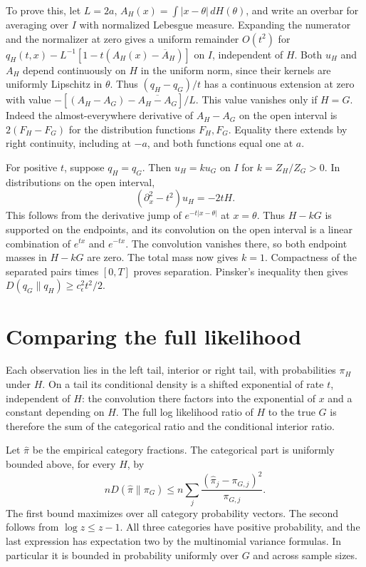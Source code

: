 \documentclass[11pt]{amsart}
\begin{document}
To prove this, let \(L=2a\), \(A_H(x)=\int|x-\theta|\,dH(\theta)\), and write an overbar for averaging over \(I\) with normalized Lebesgue measure. Expanding the numerator and the normalizer at zero gives a uniform remainder \(O(t^2)\) for \(q_H(t,x)-L^{-1}[1-t(A_H(x)-\overline A_H)]\) on \(I\), independent of \(H\). Both \(u_H\) and \(A_H\) depend continuously on \(H\) in the uniform norm, since their kernels are uniformly Lipschitz in \(\theta\). Thus \((q_H-q_G)/t\) has a continuous extension at zero with value \(-[(A_H-A_G)-\overline{A_H-A_G}]/L\). This value vanishes only if \(H=G\). Indeed the almost-everywhere derivative of \(A_H-A_G\) on the open interval is \(2(F_H-F_G)\) for the distribution functions \(F_H,F_G\). Equality there extends by right continuity, including at \(-a\), and both functions equal one at \(a\).

For positive \(t\), suppose \(q_H=q_G\). Then \(u_H=k u_G\) on \(I\) for \(k=Z_H/Z_G>0\). In distributions on the open interval,
\[
                       (\partial_x^2-t^2)u_H=-2t H.
\]
This follows from the derivative jump of \(e^{-t|x-\theta|}\) at \(x=\theta\). Thus \(H-kG\) is supported on the endpoints, and its convolution on the open interval is a linear combination of \(e^{tx}\) and \(e^{-tx}\). The convolution vanishes there, so both endpoint masses in \(H-kG\) are zero. The total mass now gives \(k=1\). Compactness of the separated pairs times \([0,T]\) proves separation. Pinsker's inequality then gives \(D(q_G\|q_H)\ge c_\epsilon^2t^2/2\).

\section{Comparing the full likelihood}
Each observation lies in the left tail, interior or right tail, with probabilities \(\pi_H\) under \(H\). On a tail its conditional density is a shifted exponential of rate \(t\), independent of \(H\): the convolution there factors into the exponential of \(x\) and a constant depending on \(H\). The full log likelihood ratio of \(H\) to the true \(G\) is therefore the sum of the categorical ratio and the conditional interior ratio.

Let \(\widehat\pi\) be the empirical category fractions. The categorical part is uniformly bounded above, for every \(H\), by
\[
 n D(\widehat\pi\|\pi_G)
     \le n\sum_j\frac{(\widehat\pi_j-\pi_{G,j})^2}{\pi_{G,j}} .
\]
The first bound maximizes over all category probability vectors. The second follows from \(\log z\le z-1\). All three categories have positive probability, and the last expression has expectation two by the multinomial variance formulas. In particular it is bounded in probability uniformly over \(G\) and across sample sizes.
\end{document}

